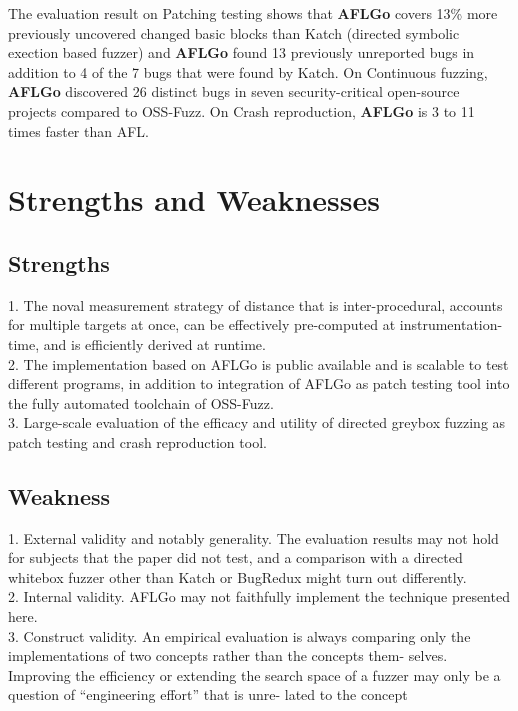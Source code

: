 \documentclass[letterpaper,11pt]{article}
\begin{document}
The evaluation result on Patching testing shows that \textbf{AFLGo} covers 13\% more previously uncovered changed basic blocks than Katch (directed symbolic exection based fuzzer) and \textbf{AFLGo} found 13 previously unreported bugs in addition to 4 of the 7 bugs that were found by Katch. On Continuous fuzzing, \textbf{AFLGo} discovered 26 distinct bugs in seven security-critical open-source projects compared to OSS-Fuzz. On Crash reproduction, \textbf{AFLGo} is 3 to 11 times faster than AFL. 

\section{Strengths and Weaknesses}
\subsection {Strengths}
1. The noval measurement strategy of distance that is inter-procedural, accounts for multiple targets at once, can be effectively pre-computed at
instrumentation-time, and is efficiently derived at runtime.\\
2. The implementation based on AFLGo is public available and is scalable to test different programs, in addition to integration of AFLGo as patch testing tool into the fully automated toolchain of OSS-Fuzz. \\
3. Large-scale evaluation of the efficacy and utility of directed greybox fuzzing as patch testing and crash reproduction tool. 

\subsection {Weakness}
1. External validity and notably generality. The evaluation results may not hold for subjects that the paper did not test, and a comparison with a directed whitebox fuzzer other than Katch or BugRedux might turn out differently.\\
2. Internal validity. AFLGo may not faithfully implement the technique presented here.\\
3. Construct validity. An empirical evaluation is always comparing only the implementations of two concepts rather than the concepts them- selves. Improving the efficiency or extending the search space of a fuzzer may only be a question of “engineering effort” that is unre- lated to the concept


  
\end{document}
